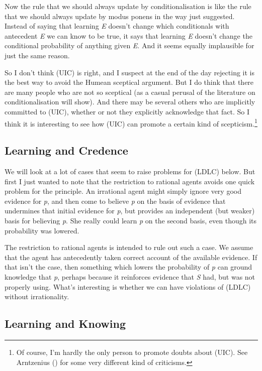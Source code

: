 \documentclass[
  10pt,
  letterpaper,
  DIV=11,
  numbers=noendperiod,
  twoside]{scrartcl}
\begin{document}
Now the rule that we should always update by conditionalisation is like
the rule that we should always update by modus ponens in the way just
suggested. Instead of saying that learning \emph{E} doesn't change which
conditionals with antecedent \emph{E} we can know to be true, it says
that learning \emph{E} doesn't change the conditional probability of
anything given \emph{E}. And it seems equally implausible for just the
same reason.

So I don't think (UIC) is right, and I suspect at the end of the day
rejecting it is the best way to avoid the Humean sceptical argument. But
I do think that there are many people who are not so sceptical (as a
casual perusal of the literature on conditionalisation will show). And
there may be several others who are implicitly committed to (UIC),
whether or not they explicitly acknowledge that fact. So I think it is
interesting to see how (UIC) can promote a certain kind of
scepticism.\footnote{Of course, I'm hardly the only person to promote
  doubts about (UIC). See Arntzenius
  () for some very different
  kind of criticisms.}

\subsection{Learning and Credence}\label{learning-and-credence}

We will look at a lot of cases that seem to raise problems for (LDLC)
below. But first I just wanted to note that the restriction to rational
agents avoids one quick problem for the principle. An irrational agent
might simply ignore very good evidence for \emph{p}, and then come to
believe \emph{p} on the basis of evidence that undermines that initial
evidence for \emph{p}, but provides an independent (but weaker) basis
for believing \emph{p}. She really could learn \emph{p} on the second
basis, even though its probability was lowered.

The restriction to rational agents is intended to rule out such a case.
We assume that the agent has antecedently taken correct account of the
available evidence. If that isn't the case, then something which lowers
the probability of \emph{p} can ground knowledge that \emph{p}, perhaps
because it reinforces evidence that \emph{S} had, but was not properly
using. What's interesting is whether we can have violations of (LDLC)
without irrationality.

\subsection{Learning and Knowing}\label{learning-and-knowing}
\end{document}
